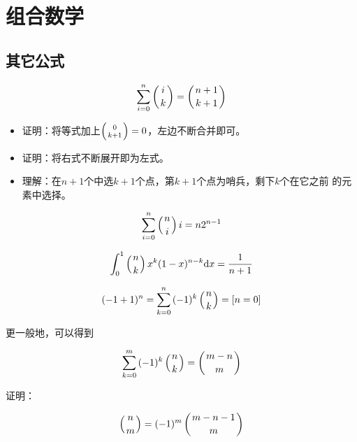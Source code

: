 \chapter{组合数学}




\section{其它公式}
\begin{theorem}
    \begin{displaymath}
        \sum_{i=0}^n\left(i \atop k\right)=\left(n+1 \atop k+1\right)
    \end{displaymath}
\end{theorem}
\begin{itemize}
    \item 证明：将等式加上$\left(0 \atop k+1\right)=0$，左边不断合并即可。
    \item 证明：将右式不断展开即为左式。
    \item 理解：在$n+1$个中选$k+1$个点，第$k+1$个点为哨兵，剩下$k$个在它之前
    的元素中选择。
\end{itemize}
\begin{theorem}
    \begin{displaymath}
        \sum_{i=0}^n{\left(n \atop i\right)i}=n2^{n-1}
    \end{displaymath}
\end{theorem}
\begin{theorem}
    \begin{displaymath}
        \int_0^1{\left(n \atop k\right)x^k(1-x)^{n-k}\mathrm{d} x}=\frac{1}{n+1}
    \end{displaymath}
\end{theorem}
\begin{theorem}
    \begin{displaymath}
        (-1+1)^n=\sum_{k=0}^n{(-1)^k\left(n \atop k\right)}=[n=0]
    \end{displaymath}
\end{theorem}
更一般地，可以得到
\begin{theorem}
    \begin{displaymath}\label{BSum}
        \sum_{k=0}^m{(-1)^k\left(n \atop k\right)}=\left(m-n \atop m\right)
    \end{displaymath}
\end{theorem}
证明：
\begin{lemma}[上指标反转]\label{BSL}
    \begin{displaymath}
        \left(n \atop m\right)=(-1)^m\left(m-n-1 \atop m\right)
    \end{displaymath}
\end{lemma}
